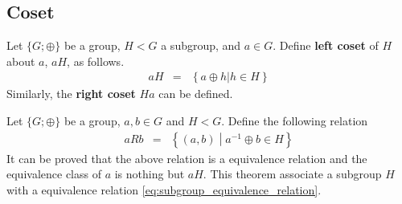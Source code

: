 \subsection{Coset}

Let $\{G;\oplus\}$ be a group, $H < G$ a subgroup, and $a\in G$. Define \textbf{left coset} of $H$ about $a$, $aH$, as follows.
\begin{eqnarray}
  aH &=& \left\{a\oplus h| h \in H \right\} \nonumber
\end{eqnarray} 
Similarly, the \textbf{right coset} $Ha$ can be defined.

Let $\{G;\oplus\}$ be a group, $a,b \in G$ and $H<G$. Define the following relation 
\begin{eqnarray}
  aRb &=& \left\{(a,b) \middle| a^{-1}\oplus b\in H \right\}  \label{eq:subgroup_equivalence_relation}
\end{eqnarray}
It can be proved that the above relation is a equivalence relation and the equivalence class of $a$ is nothing but $aH$. This theorem associate a subgroup $H$ with a equivalence relation \eqref{eq:subgroup_equivalence_relation}.










































